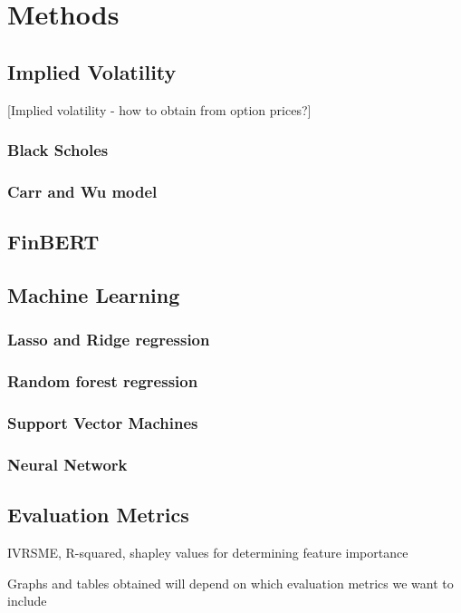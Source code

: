 \section{Methods} \label{methods}

\subsection{Implied Volatility} \label{4_implied_vol}
[Implied volatility - how to obtain from option prices?]

\subsubsection{Black Scholes}
\subsubsection{Carr and Wu model}

\subsection{FinBERT}

\subsection{Machine Learning} \label{4_ML_techniques}

\subsubsection{Lasso and Ridge regression}
\subsubsection{Random forest regression}
\subsubsection{Support Vector Machines}
\subsubsection{Neural Network}

\subsection{Evaluation Metrics} \label{4_Evaluation_metrics}
IVRSME, R-squared, shapley values for determining feature importance


Graphs and tables obtained will depend on which evaluation metrics we want to include